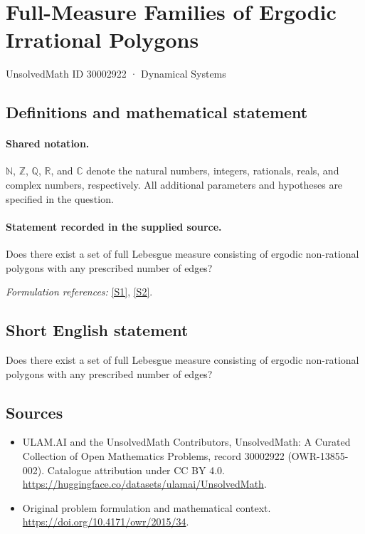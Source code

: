 \documentclass[11pt]{article}
\newcommand{\sref}[2]{\hyperlink{source:#1:#2}{[S#2]}}
\begin{document}
\setcounter{section}{30002921}
\section{Full-Measure Families of Ergodic Irrational Polygons}\label{30002922}
{\small UnsolvedMath ID 30002922 · Dynamical Systems}
\subsection{Definitions and mathematical statement}

\paragraph{Shared notation.}$\mathbb N$, $\mathbb Z$, $\mathbb Q$, $\mathbb R$, and $\mathbb C$ denote the natural numbers, integers, rationals, reals, and complex numbers, respectively. All additional parameters and hypotheses are specified in the question.


\paragraph{Statement recorded in the supplied source.}
Does there exist a set of full Lebesgue measure consisting of ergodic non-rational polygons with any prescribed number of edges?
\par\smallskip\textit{Formulation references:} \sref{30002922}{1}, \sref{30002922}{2}.
\subsection{Short English statement}
Does there exist a set of full Lebesgue measure consisting of ergodic non-rational polygons with any prescribed number of edges?
\subsection{Sources}
\begin{itemize}
\item[\hypertarget{source:30002922:1}{S1}] ULAM.AI and the UnsolvedMath Contributors, UnsolvedMath: A Curated Collection of Open Mathematics Problems, record 30002922 (OWR-13855-002). Catalogue attribution under CC BY 4.0.
\url{https://huggingface.co/datasets/ulamai/UnsolvedMath}.
\item[\hypertarget{source:30002922:2}{S2}] Original problem formulation and mathematical context.
\url{https://doi.org/10.4171/owr/2015/34}.
\end{itemize}
\label{end:30002922}
\end{document}
